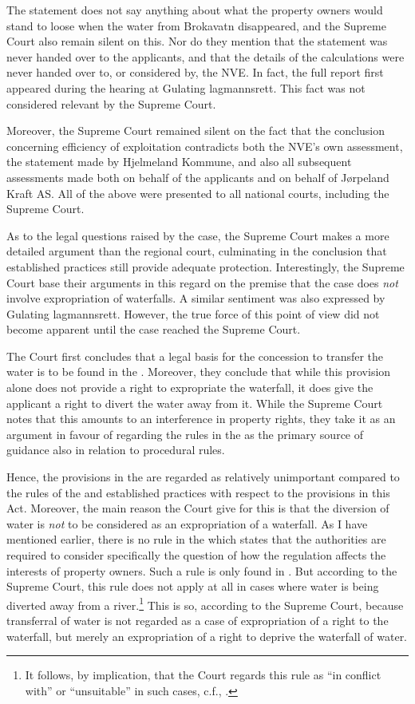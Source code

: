 The statement does not say anything about what the property owners would stand to loose when the water from Brokavatn disappeared, and the Supreme Court also remain silent on this. Nor do they mention that the statement was never handed over to the applicants, and that the details of the calculations were never handed over to, or considered by, the NVE. In fact, the full report first appeared during the hearing at Gulating lagmannsrett. This fact was not considered relevant by the Supreme Court.

Moreover, the Supreme Court remained silent on the fact that the conclusion concerning efficiency of exploitation contradicts both the NVE's own assessment, the statement made by Hjelmeland Kommune, and also all subsequent assessments made both on behalf of the applicants and on behalf of Jørpeland Kraft AS. All of the above were presented to all national courts, including the Supreme Court.

As to the legal questions raised by the case, the Supreme Court makes a more detailed argument than the regional court, culminating in the conclusion that established practices still provide adequate protection. Interestingly, the Supreme Court base their arguments in this regard on the premise that the case does \emph{not} involve expropriation of waterfalls. A similar sentiment was also expressed by Gulating lagmannsrett. However, the true force of this point of view did not become apparent until the case reached the Supreme Court.

The Court first concludes that a legal basis for the concession to transfer the water is to be found in the \cite[16]{wra17}. Moreover, they conclude that while this provision alone does not provide a right to expropriate the waterfall, it does give the applicant a right to divert the water away from it. While the Supreme Court notes that this amounts to an interference in property rights, they take it as an argument in favour of regarding the rules in the \cite{wra17} as the primary source of guidance also in relation to procedural rules. 

Hence, the provisions in the \cite{ea59} are regarded as relatively unimportant compared to the rules of the \cite{wra17} and established practices with respect to the provisions in this Act. Moreover, the main reason the Court give for this is that the diversion of water is \emph{not} to be considered as an expropriation of a waterfall. As I have mentioned earlier, there is no rule in the \cite{wra17} which states that the authorities are required to consider specifically the question of how the regulation affects the interests of property owners. Such a rule is only found in \cite[2]{ea59}. But according to the Supreme Court, this rule does not apply at all in cases where water is being diverted away from a river.\footnote{It follows, by implication, that the Court regards this rule as ``in conflict with'' or ``unsuitable'' in such cases, c.f., \cite[31]{ea59}.} This is so, according to the Supreme Court, because transferral of water is not regarded as a case of expropriation of a right to the waterfall, but merely an expropriation of a right to deprive the waterfall of water.

